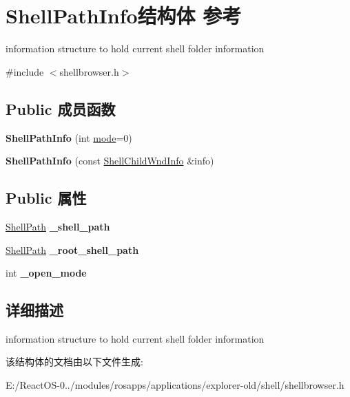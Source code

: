 \hypertarget{struct_shell_path_info}{}\section{Shell\+Path\+Info结构体 参考}
\label{struct_shell_path_info}


information structure to hold current shell folder information  




{\ttfamily \#include $<$shellbrowser.\+h$>$}

\subsection*{Public 成员函数}
\begin{DoxyCompactItemize}
\item 
\mbox{\label{struct_shell_path_info_a01cacf6e558bda7f33dbe3cc9755889b}} 
{\bfseries Shell\+Path\+Info} (int \hyperlink{interfacevoid}{mode}=0)
\item 
\mbox{\label{struct_shell_path_info_a421643ce6f335fff006f5b9a8c8e4779}} 
{\bfseries Shell\+Path\+Info} (const \hyperlink{struct_shell_child_wnd_info}{Shell\+Child\+Wnd\+Info} \&info)
\end{DoxyCompactItemize}
\subsection*{Public 属性}
\begin{DoxyCompactItemize}
\item 
\mbox{\label{struct_shell_path_info_a18505354de463847a69f341f7f26c88a}} 
\hyperlink{struct_shell_path}{Shell\+Path} {\bfseries \+\_\+shell\+\_\+path}
\item 
\mbox{\label{struct_shell_path_info_afecaace454f1785517f2b696d3f16034}} 
\hyperlink{struct_shell_path}{Shell\+Path} {\bfseries \+\_\+root\+\_\+shell\+\_\+path}
\item 
\mbox{\label{struct_shell_path_info_a514cdfe8a842ec120572c86b8732fb3f}} 
int {\bfseries \+\_\+open\+\_\+mode}
\end{DoxyCompactItemize}


\subsection{详细描述}
information structure to hold current shell folder information 

该结构体的文档由以下文件生成\+:\begin{DoxyCompactItemize}
\item 
E\+:/\+React\+O\+S-\/0../modules/rosapps/applications/explorer-\/old/shell/shellbrowser.\+h\end{DoxyCompactItemize}
